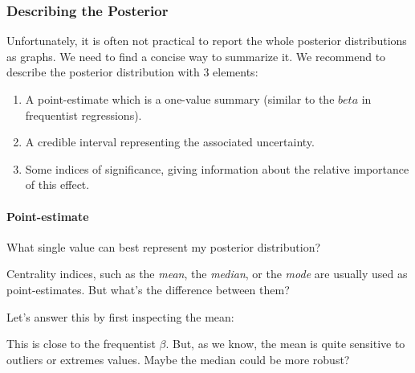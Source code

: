 \documentclass[10pt,a4paper,onecolumn]{article}
\newenvironment{Shaded}{\begin{snugshade}}{\end{snugshade}}
\newcommand{\CommentTok}[1]{\textcolor[rgb]{0.56,0.35,0.01}{\textit{#1}}}
\newcommand{\FunctionTok}[1]{\textcolor[rgb]{0.00,0.00,0.00}{#1}}
\newcommand{\NormalTok}[1]{#1}
\newcommand{\SpecialCharTok}[1]{\textcolor[rgb]{0.00,0.00,0.00}{#1}}
\providecommand{\tightlist}{%
  \setlength{\itemsep}{0pt}\setlength{\parskip}{0pt}}
\let\oldparagraph\paragraph
\renewcommand{\paragraph}[1]{\oldparagraph{#1}\mbox{}}
\begin{document}
\hypertarget{describing-the-posterior}{%
\subsubsection{Describing the
Posterior}\label{describing-the-posterior}}

Unfortunately, it is often not practical to report the whole posterior
distributions as graphs. We need to find a concise way to summarize it.
We recommend to describe the posterior distribution with 3 elements:

\begin{enumerate}
\def\labelenumi{\arabic{enumi}.}
\tightlist
\item
  A point-estimate which is a one-value summary (similar to the \(beta\)
  in frequentist regressions).
\item
  A credible interval representing the associated uncertainty.
\item
  Some indices of significance, giving information about the relative
  importance of this effect.
\end{enumerate}

\hypertarget{point-estimate}{%
\paragraph{Point-estimate}\label{point-estimate}}

What single value can best represent my posterior distribution?

Centrality indices, such as the \emph{mean}, the \emph{median}, or the
\emph{mode} are usually used as point-estimates. But what's the
difference between them?

Let's answer this by first inspecting the mean:

\begin{Shaded}
\end{Shaded}

This is close to the frequentist \(\beta\). But, as we know, the mean is
quite sensitive to outliers or extremes values. Maybe the median could
be more robust?

\begin{Shaded}
\end{Shaded}
\end{document}
